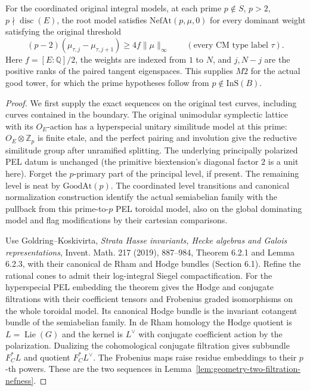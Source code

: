 \begin{proposition}
\label{prop:geometry-uncorrected-flag-nefness}
For the coordinated original integral models, at each prime
\(p\notin S\), \(p>2\), \(p\nmid\operatorname{disc}(E)\), the root
model satisfies \(\mathrm{NefAt}(p,\mu,0)\) for every dominant
weight satisfying the original threshold
\[
 (p-2)(\mu_{\tau,j}-\mu_{\tau,j+1})
 \ge 4 f\|\mu\|_\infty\qquad(\text{every CM type label }\tau).
 \tag{UN2}
\]
Here \(f=[E:\mathbb Q]/2\), the weights are indexed from \(1\) to
\(N\), and \(j,N-j\) are the positive ranks of the paired tangent
eigenspaces. This supplies \(M2\) for the actual good tower,
for which the prime hypotheses follow from
\(p\notin\mathrm{InS}(B)\).
\end{proposition}
\begin{proof}
We first supply the exact sequences on the original test curves,
including curves contained in the boundary. The original unimodular
symplectic lattice with its \(O_E\)-action has a hyperspecial unitary
similitude model at this prime: \(O_E\otimes\mathbb Z_p\) is finite
etale, and the perfect pairing and involution give the reductive
similitude group after unramified splitting. The underlying principally
polarized PEL datum is unchanged (the primitive biextension's diagonal
factor \(2\) is a unit here). Forget the \(p\)-primary part of the
principal level, if present. The remaining level is neat by
\(\mathrm{GoodAt}(p)\). The coordinated level transitions and canonical
normalization construction identify the actual semiabelian family
with the pullback from this prime-to-\(p\) PEL toroidal model, also on
the global dominating model and flag modifications by their
cartesian comparisons.

Use Goldring--Koskivirta, \emph{Strata Hasse invariants, Hecke
algebras and Galois representations}, Invent. Math. 217 (2019),
887--984, Theorem 6.2.1 and Lemma 6.2.3, with their canonical
de Rham and Hodge bundles (Section 6.1). Refine the rational cones
to admit their log-integral Siegel compactification. For the
hyperspecial PEL embedding the theorem gives the Hodge and conjugate
filtrations with their coefficient tensors and Frobenius graded
isomorphisms on the whole toroidal model. Its canonical Hodge bundle
is the invariant cotangent bundle of the semiabelian family.
In de Rham homology the Hodge quotient is \(L=\operatorname{Lie}(G)\)
and the kernel is \(L^\vee\) with conjugate coefficient action by
the polarization. Dualizing the cohomological conjugate filtration
gives subbundle \(F_C^*L\) and quotient \(F_C^*L^\vee\).
The Frobenius maps raise residue embeddings to their \(p\)-th
powers. These are the two sequences in
Lemma~\ref{lem:geometry-two-filtration-nefness}.


\end{proof}
